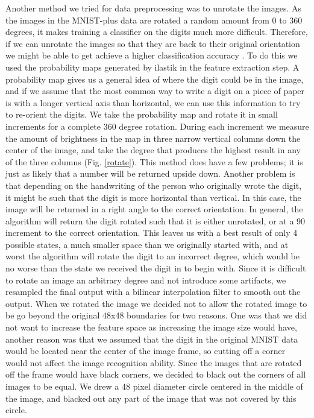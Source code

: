 \documentclass[conference]{IEEEtran}
\begin{document}
Another method we tried for data preprocessing was to unrotate the images. As the images in the MNIST-plus data are rotated a random amount from 0 to 360 degrees, it makes training a classifier on the digits much more difficult. Therefore, if we can unrotate the images so that they are back to their original orientation we might be able to get achieve a higher classification accuracy \cite{journals/pr/TeowL02}. To do this we used the probability maps generated by ilastik in the feature extraction step. A probability map gives us a general idea of where the digit could be in the image, and if we assume that the most common way to write a digit on a piece of paper is with a longer vertical axis than horizontal, we can use this information to try to re-orient the digits. We take the probability map and rotate it in small increments for a complete 360 degree rotation. During each increment we measure the amount of brightness in the map in three narrow vertical columns down the center of the image, and take the degree that produces the highest result in any of the three columns (Fig. \ref{rotate}). This method does have a few problems; it is just as likely that a number will be returned upside down. Another problem is that depending on the handwriting of the person who originally wrote the digit, it might be such that the digit is more horizontal than vertical. In this case, the image will be returned in a right angle to the correct orientation. In general, the algorithm will return the digit rotated such that it is either unrotated, or at a 90\degree \hspace{1 pt} increment to the correct orientation. This leaves us with a best result of only 4 possible states, a much smaller space than we originally started with, and at worst the algorithm will rotate the digit to an incorrect degree, which would be no worse than the state we received the digit in to begin with. Since it is difficult to rotate an image an arbitrary degree and not introduce some artifacts, we resampled the final output with a bilinear interpolation filter to smooth out the output. When we rotated the image we decided not to allow the rotated image to be go beyond the original 48x48 boundaries for two reasons. One was that we did not want to increase the feature space as increasing the image size would have, another reason was that we assumed that the digit in the original MNIST data would be located near the center of the image frame, so cutting off a corner would not affect the image recognition ability. Since the images that are rotated off the frame would have black corners, we decided to black out the corners of all images to be equal. We drew a 48 pixel diameter circle centered in the middle of the image, and blacked out any part of the image that was not covered by this circle.
\end{document}

